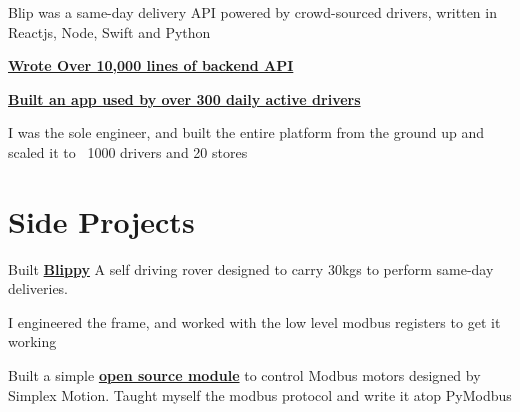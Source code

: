 \documentclass[]{deedy-resume-openfont}
\begin{document}
\begin{minipage}[t]{0.66\textwidth}
\vspace{\topsep} %
\begin{tightemize}
\item Blip was a same-day delivery API powered by crowd-sourced drivers, written in Reactjs, Node, Swift and Python
\item \textbf{\href{https://blip-live.firebaseapp.com/#intro}{Wrote Over 10,000 lines of backend API}}
\item \textbf{\href{https://apps.apple.com/ca/app/blip-driver/id1397140753}{Built an app used by over 300 daily active drivers}}
\item I was the sole engineer, and built the entire platform from the ground up and scaled it to ~1000 drivers and 20 stores
\end{tightemize}
\sectionsep



\section{Side Projects}
Built \textbf{\href{https://drive.google.com/drive/u/3/folders/16rhXzpnnE2r-Tf5yzjvB5i6v06zM74ir}{Blippy}} A self driving rover designed to carry 30kgs to perform same-day deliveries.
\item I engineered the frame, and worked with the low level modbus registers to get it working
\sectionsep

Built a simple \textbf{\href{https://github.com/srikanthsrnvs/pysimplex}{open source module}} to control Modbus motors designed by Simplex Motion. Taught myself the modbus protocol and write it atop PyModbus
\sectionsep


\end{minipage} 
\end{document}
